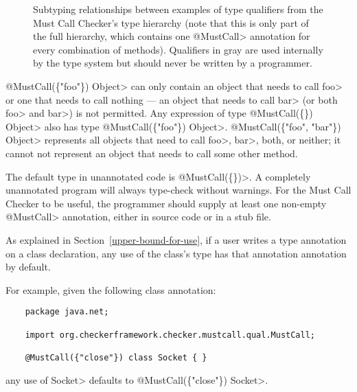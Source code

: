 \begin{figure}
\caption{Subtyping relationships between examples of type qualifiers from the Must Call Checker's type
hierarchy (note that this is only part of the full hierarchy, which contains one \<@MustCall> annotation
for every combination of methods).
Qualifiers in gray are used internally by the type system but should
never be written by a programmer.}
\label{fig-must-call-hierarchy}
\end{figure}

\<@MustCall(\{"foo"\}) Object> can only
contain an object that needs to call \<foo> or one that needs to call nothing --- an
object that needs to call \<bar> (or both \<foo> and \<bar>) is not permitted.
Any expression of type \<@MustCall(\{\}) Object> also has type
\<@MustCall(\{"foo"\}) Object>.
\<@MustCall(\{"foo", "bar"\}) Object> represents all objects that need to
call \<foo>, \<bar>, both, or neither; it cannot not represent an object that needs
to call some other method.

The default type in unannotated code is \<@MustCall(\{\})>.
A completely unannotated program will always type-check without warnings.
For the Must Call Checker to be useful, the programmer should supply at least one non-empty
\<@MustCall> annotation, either in source code or in a stub file.


As explained in Section~\ref{upper-bound-for-use}, if a user writes a type
annotation on a class declaration, any use of the class's type has that
annotation annotation by default.

For example, given the following class annotation:
\begin{Verbatim}
    package java.net;

    import org.checkerframework.checker.mustcall.qual.MustCall;

    @MustCall({"close"}) class Socket { }
\end{Verbatim}
any use of \<Socket> defaults to \<@MustCall(\{"close"\}) Socket>.



